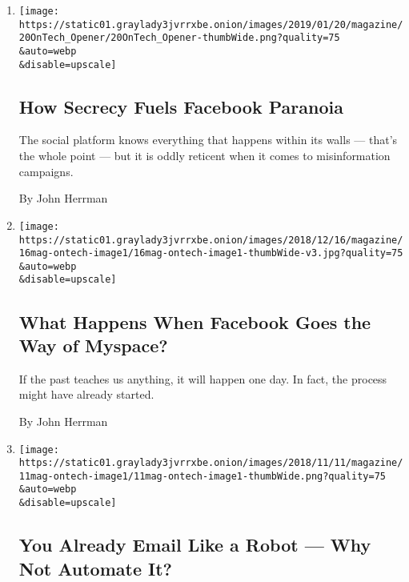 \begin{enumerate}
\def\labelenumi{\arabic{enumi}.}
\item
  \href{/2019/01/16/magazine/facebook-election-analytics.html}{}

  \texttt{[image: https://static01.graylady3jvrrxbe.onion/images/2019/01/20/magazine/20OnTech\_Opener/20OnTech\_Opener-thumbWide.png?quality=75\\\&auto=webp\\\&disable=upscale]}

  \hypertarget{how-secrecy-fuels-facebook-paranoia}{%
  \subsection{How Secrecy Fuels Facebook
  Paranoia}\label{how-secrecy-fuels-facebook-paranoia}}

  The social platform knows everything that happens within its walls ---
  that's the whole point --- but it is oddly reticent when it comes to
  misinformation campaigns.

  By John Herrman
\item
  \href{/2018/12/12/magazine/what-happens-when-facebook-goes-the-way-of-myspace.html}{}

  \texttt{[image: https://static01.graylady3jvrrxbe.onion/images/2018/12/16/magazine/16mag-ontech-image1/16mag-ontech-image1-thumbWide-v3.jpg?quality=75\\\&auto=webp\\\&disable=upscale]}

  \hypertarget{what-happens-when-facebook-goes-the-way-of-myspace}{%
  \subsection{What Happens When Facebook Goes the Way of
  Myspace?}\label{what-happens-when-facebook-goes-the-way-of-myspace}}

  If the past teaches us anything, it will happen one day. In fact, the
  process might have already started.

  By John Herrman
\item
  \href{/2018/11/07/magazine/you-already-email-like-a-robot-why-not-automate-it.html}{}

  \texttt{[image: https://static01.graylady3jvrrxbe.onion/images/2018/11/11/magazine/11mag-ontech-image1/11mag-ontech-image1-thumbWide.png?quality=75\\\&auto=webp\\\&disable=upscale]}

  \hypertarget{you-already-email-like-a-robot--why-not-automate-it}{%
  \subsection{You Already Email Like a Robot --- Why Not Automate
  It?}\label{you-already-email-like-a-robot--why-not-automate-it}}


\end{enumerate}
